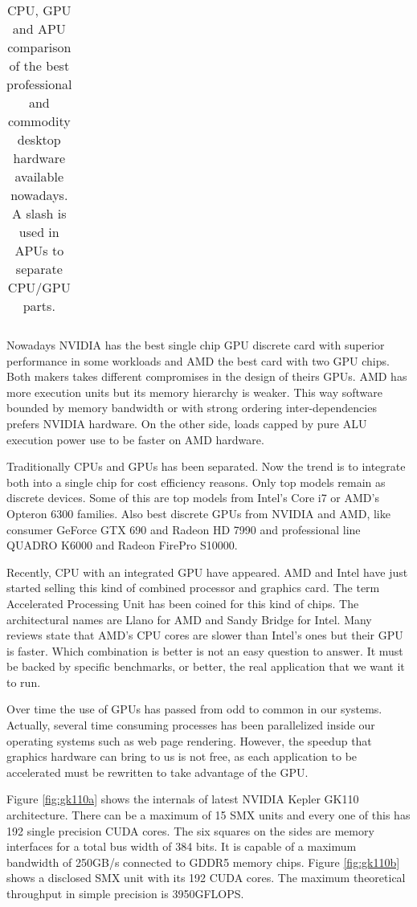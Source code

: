 \documentclass{comjnl}
\begin{document}
\begin{table*}[h]
\begin{tabular}{|c|c|c|c|c|c|c|c|c|}
\end{tabular}
\caption{CPU, GPU and APU comparison of the best professional and commodity desktop hardware available nowadays. A slash is used in APUs to separate CPU/GPU parts.
\label{tab:features}}
\end{table*}

Nowadays NVIDIA has the best single chip GPU discrete card with superior performance in some workloads and AMD the best card with two GPU chips. Both makers takes different compromises in the design of theirs GPUs. AMD has more execution units but its memory hierarchy is weaker. This way software bounded by memory bandwidth or with strong ordering inter-dependencies prefers NVIDIA hardware. On the other side, loads capped by pure ALU execution power use to be faster on AMD hardware.

Traditionally CPUs and GPUs has been separated. Now the trend is to integrate both into a single chip for cost efficiency reasons. Only top models remain as discrete devices. Some of this are top models from Intel's Core i7 or AMD's Opteron 6300 families. Also best discrete GPUs from NVIDIA and AMD, like consumer GeForce GTX 690 and Radeon HD 7990 and professional line QUADRO K6000 and Radeon FirePro S10000.

Recently, CPU with an integrated GPU have appeared. AMD and Intel have just started selling this kind of combined processor and graphics card. The term Accelerated Processing Unit has been coined for this kind of chips. The architectural names are Llano for AMD and Sandy Bridge for Intel. Many reviews state that AMD's CPU cores are slower than Intel's ones but their GPU is faster. Which combination is better is not an easy question to answer. It must be backed by specific benchmarks, or better, the real application that we want it to run.

Over time the use of GPUs has passed from odd to common in our systems. Actually, several time consuming processes has been parallelized inside our operating systems such as web page rendering. However, the speedup that graphics hardware can bring to us is not free, as each application to be accelerated must be rewritten to take advantage of the GPU.

Figure \ref{fig:gk110a} shows the internals of latest NVIDIA Kepler GK110 architecture. There can be a maximum of 15 SMX units and every one of this has 192 single precision CUDA cores. The six squares on the sides are memory interfaces for a total bus width of 384 bits. It is capable of a maximum bandwidth of 250GB/s connected to GDDR5 memory chips. Figure \ref{fig:gk110b} shows a disclosed SMX unit with its 192 CUDA cores. The maximum theoretical throughput in simple precision is 3950GFLOPS.
\end{document}
